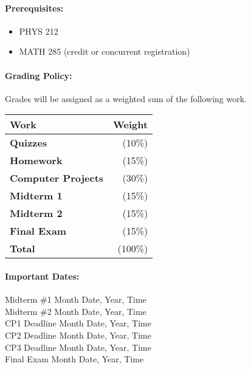 \documentclass[11pt, a4paper]{article}
\begin{document}
\paragraph{Prerequisites:} 
\begin{itemize}
\item PHYS 212
\item MATH 285 (credit or concurrent registration)
\end{itemize}

\paragraph{Grading Policy:} Grades will be assigned as a weighted sum of the following work. 

\begin{table}[h]
\begin{tabularx}{\textwidth}{Xr}
\textbf{Work} & \textbf{Weight}\\
\hline
\textbf{Quizzes} & (10\%) \\
\textbf{Homework} & (15\%) \\
\textbf{Computer Projects} & (30\%) \\
\textbf{Midterm 1} & (15\%) \\
\textbf{Midterm 2} & (15\%) \\
\textbf{Final Exam} & (15\%) \\
\hline
\textbf{Total} & (100\%) \\
\end{tabularx}
\end{table}

\paragraph{Important Dates:}
\begin{center} \begin{minipage}{3.8in}
\begin{flushleft}
Midterm \#1       \dotfill Month Date, Year, Time  \\
Midterm \#2       \dotfill Month Date, Year, Time  \\
CP1 Deadline      \dotfill Month Date, Year, Time  \\
CP2 Deadline      \dotfill Month Date, Year, Time  \\
CP3 Deadline      \dotfill Month Date, Year, Time  \\
Final Exam        \dotfill Month Date, Year, Time  \\
\end{flushleft}
\end{minipage}
\end{center}
\end{document}
